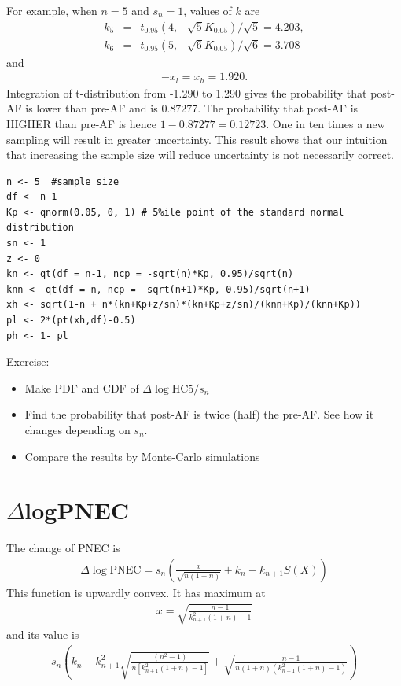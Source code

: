 \documentclass[10pt]{article}
\begin{document}
For example, when $n=5$ and $s_n=1$, values of $k$ are
\begin{eqnarray*}
k_5 &=& t_{0.95}(4, -\sqrt{5}K_{0.05})/\sqrt{5} = 4.203, \\
k_6 &=& t_{0.95}(5, -\sqrt{6}K_{0.05})/\sqrt{6} = 3.708
\end{eqnarray*}
and
\begin{eqnarray*}
-x_l = x_h = 1.920.
\end{eqnarray*}
Integration of t-distribution from -1.290 to 1.290 gives the  probability that post-AF is lower than pre-AF and is  0.87277. The probability that post-AF is HIGHER than pre-AF is hence $1-0.87277 = 0.12723$. One in ten times a new sampling will result in greater uncertainty. This result shows that our intuition that increasing the sample size will reduce uncertainty is not necessarily correct.

\begin{lstlisting}[caption=Probability that $\Delta\log\mathrm{AF}/s_n$ is positive, label=fuga2]
n <- 5  #sample size
df <- n-1
Kp <- qnorm(0.05, 0, 1) # 5%ile point of the standard normal distribution
sn <- 1
z <- 0
kn <- qt(df = n-1, ncp = -sqrt(n)*Kp, 0.95)/sqrt(n)
knn <- qt(df = n, ncp = -sqrt(n+1)*Kp, 0.95)/sqrt(n+1)
xh <- sqrt(1-n + n*(kn+Kp+z/sn)*(kn+Kp+z/sn)/(knn+Kp)/(knn+Kp))
pl <- 2*(pt(xh,df)-0.5)
ph <- 1- pl
\end{lstlisting}

Exercise:
\begin{itemize}
\item Make PDF and CDF of $\Delta\log\mathrm{HC5}/s_n$
\item Find the probability that post-AF is twice (half) the pre-AF. See how it changes depending on $s_n$.
\item Compare the results by Monte-Carlo simulations
\end{itemize}

\newpage
\section{$\Delta$logPNEC}
The change of PNEC is 
\begin{eqnarray*}
\Delta\log\mathrm{PNEC} = s_n\left(  \frac{x}{\sqrt{n(1+n)}} +k_n - k_{n+1} S(X) \right)
\end{eqnarray*}
This function is upwardly convex. It has maximum at 
\begin{eqnarray*}
x = \sqrt{\frac{n-1}{k_{n+1}^2(1+n)-1}}
\end{eqnarray*}
and its value is
\begin{eqnarray*}
s_n\left( k_n-k_{n+1}^2\sqrt{\frac{(n^2-1)}{n[k_{n+1}^2(1+n)-1]}} + \sqrt{\frac{n-1}{n(1+n)(k_{n+1}^2(1+n)-1)}}\right)
\end{eqnarray*}
\end{document}
